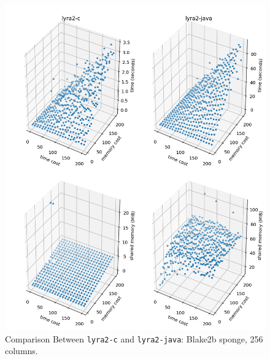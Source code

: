 \begin{figure}[p]
    \centering
    \includegraphics[width=\linewidth,keepaspectratio]{figures/tcost_mcost_blake2b_256}
    \caption{Comparison Between \texttt{lyra2-c} and \texttt{lyra2-java}: Blake2b sponge, 256 columns.}
    \label{figure:tcost_mcost_blake2b_256}
\end{figure}

